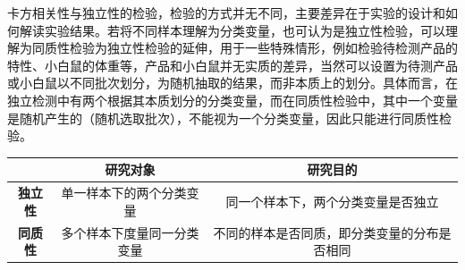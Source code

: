 \documentclass[11pt]{article}
\begin{document}
卡方相关性与独立性的检验，检验的方式并无不同，主要差异在于实验的设计和如何解读实验结果。若将不同样本理解为分类变量，也可认为是独立性检验，可以理解为同质性检验为独立性检验的延伸，用于一些特殊情形，例如检验待检测产品的特性、小白鼠的体重等，产品和小白鼠并无实质的差异，当然可以设置为待测产品或小白鼠以不同批次划分，为随机抽取的结果，而非本质上的划分。具体而言，在独立检测中有两个根据其本质划分的分类变量，而在同质性检验中，其中一个变量是随机产生的（随机选取批次），不能视为一个分类变量，因此只能进行同质性检验。
\begin{table}[H]
\centering
\begin{tabular}{@{}ccc@{}}
\toprule
& \textbf{研究对象} & \textbf{研究目的} \\ \midrule
\textbf{独立性} & 单一样本下的两个分类变量 & 同一个样本下，两个分类变量是否独立 \\
\textbf{同质性} & 多个样本下度量同一分类变量 & 不同的样本是否同质，即分类变量的分布是否相同 \\ \bottomrule
\end{tabular}
\end{table}
\end{document}
